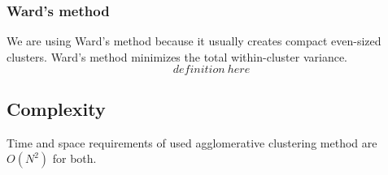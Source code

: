 \subsubsection{Ward's method}
We are using Ward's method because it usually creates compact 
even-sized clusters. \cite{ref_here} Ward's method minimizes the 
total within-cluster variance.
\begin{equation}
 definition\ here
\end{equation}



\subsection{Complexity}
Time and space requirements of used agglomerative clustering method
are $O(N^2)$ for both.



